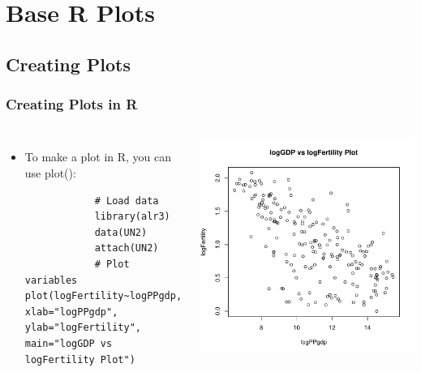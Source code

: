 \section{Base \ttfamily R \normalfont Plots}
\subsection{Creating Plots}
\begin{frame}[ fragile]
  \frametitle{Creating Plots in R}
  \begin{columns}
        \begin{itemize}
           \item To make a plot in R, you can use \ttfamily plot(): \normalfont \\
		\begin{lstlisting}
			# Load data
			library(alr3)
			data(UN2)
			attach(UN2)
			# Plot variables
plot(logFertility~logPPgdp, xlab="logPPgdp", ylab="logFertility", 
main="logGDP vs logFertility Plot")
		\end{lstlisting}
         \end{itemize}
%
       \begin{center}
         \includegraphics[width=1\textwidth]{images/UN2plot.pdf}
        \end{center}
      \end{columns}
\end{frame}      

